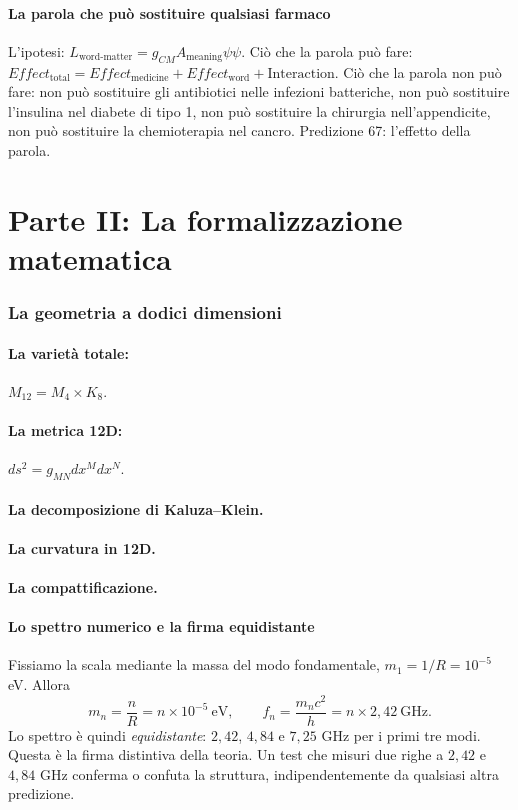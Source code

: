 \documentclass[11pt,a4paper]{article}
\begin{document}
\subsection{La parola che può sostituire qualsiasi farmaco}
L'ipotesi: $L_{\text{word-matter}} = g_{CM} A_{\text{meaning}} \psi \psi$. Ciò che la parola può fare: $Effect_{\text{total}} = Effect_{\text{medicine}} + Effect_{\text{word}} + \text{Interaction}$. Ciò che la parola non può fare: non può sostituire gli antibiotici nelle infezioni batteriche, non può sostituire l'insulina nel diabete di tipo 1, non può sostituire la chirurgia nell'appendicite, non può sostituire la chemioterapia nel cancro. Predizione 67: l'effetto della parola.

\newpage
\part*{Parte II: La formalizzazione matematica}

\section{La geometria a dodici dimensioni}
\subsection{La varietà totale:} $M_{12} = M_4 \times K_8$.
\subsection{La metrica 12D:} $ds^2 = g_{MN} dx^M dx^N$.
\subsection{La decomposizione di Kaluza--Klein.}
\subsection{La curvatura in 12D.}
\subsection{La compattificazione.}

\subsection{Lo spettro numerico e la firma equidistante}
Fissiamo la scala mediante la massa del modo fondamentale, $m_1 = 1/R = 10^{-5}$ eV. Allora
\begin{equation}
m_n = \frac{n}{R} = n \times 10^{-5}\ \text{eV},
\qquad
f_n = \frac{m_n c^2}{h} = n \times 2,42\ \text{GHz}.
\end{equation}
Lo spettro è quindi \emph{equidistante}: $2,42$, $4,84$ e $7,25$ GHz per i primi tre modi. Questa è la firma distintiva della teoria. Un test che misuri due righe a $2,42$ e $4,84$ GHz conferma o confuta la struttura, indipendentemente da qualsiasi altra predizione.
\end{document}

